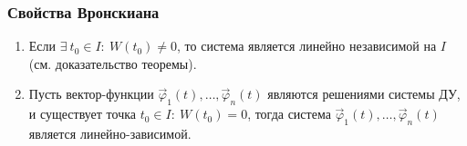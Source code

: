     \subsubsection*{Свойства Вронскиана}

    \begin{enumerate}
        \item Если $\exists ~ t_0 \in I : ~ W(t_0) \neq 0$, то система является линейно независимой на $I$ (см. доказательство теоремы).
        \item Пусть вектор-функции $\vec \varphi_1(t), \dots, \vec \varphi_n(t)$ являются решениями системы ДУ, и существует точка
        $t_0 \in I: ~ W(t_0) = 0$, тогда система $\vec \varphi_1(t), \dots, \vec \varphi_n(t)$ является линейно-зависимой.
    \end{enumerate}

